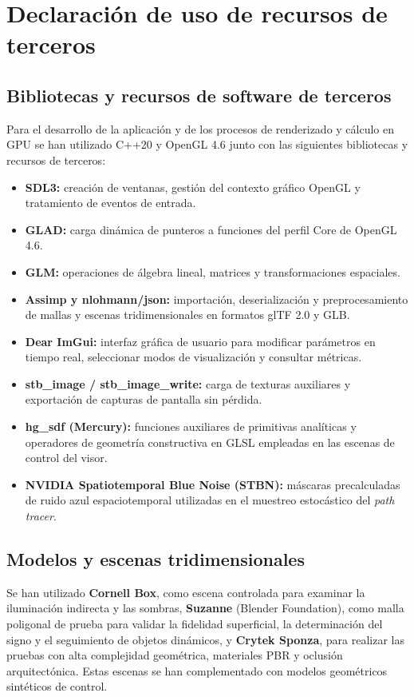 \clearpage
\section*{Declaración de uso de recursos de terceros}

\subsection*{Bibliotecas y recursos de software de terceros}

Para el desarrollo de la aplicación y de los procesos de renderizado y cálculo en GPU se han utilizado C++20 y OpenGL 4.6 junto con las siguientes bibliotecas y recursos de terceros:

\begin{itemize}
  \item \textbf{SDL3:} creación de ventanas, gestión del contexto gráfico OpenGL y tratamiento de eventos de entrada.
  \item \textbf{GLAD:} carga dinámica de punteros a funciones del perfil Core de OpenGL 4.6.
  \item \textbf{GLM:} operaciones de álgebra lineal, matrices y transformaciones espaciales.
  \item \textbf{Assimp y nlohmann/json:} importación, deserialización y preprocesamiento de mallas y escenas tridimensionales en formatos glTF 2.0 y GLB.
  \item \textbf{Dear ImGui:} interfaz gráfica de usuario para modificar parámetros en tiempo real, seleccionar modos de visualización y consultar métricas.
  \item \textbf{stb\_image / stb\_image\_write:} carga de texturas auxiliares y exportación de capturas de pantalla sin pérdida.
  \item \textbf{hg\_sdf (Mercury):} funciones auxiliares de primitivas analíticas y operadores de geometría constructiva en GLSL empleadas en las escenas de control del visor.
  \item \textbf{NVIDIA Spatiotemporal Blue Noise (STBN):} máscaras precalculadas de ruido azul espaciotemporal utilizadas en el muestreo estocástico del \textit{path tracer}.
\end{itemize}

\subsection*{Modelos y escenas tridimensionales}

Se han utilizado \textbf{Cornell Box}, como escena controlada para examinar la iluminación indirecta y las sombras, \textbf{Suzanne} (Blender Foundation), como malla poligonal de prueba para validar la fidelidad superficial, la determinación del signo y el seguimiento de objetos dinámicos, y \textbf{Crytek Sponza}, para realizar las pruebas con alta complejidad geométrica, materiales PBR y oclusión arquitectónica. Estas escenas se han complementado con modelos geométricos sintéticos de control.

